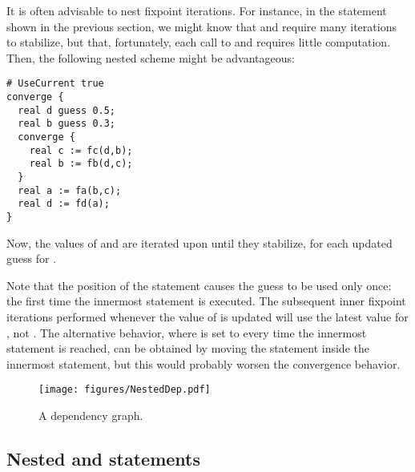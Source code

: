 It is often advisable to nest fixpoint iterations.
For instance, in the  statement shown in the previous
section, we might know that  and 
require many iterations to stabilize, but that, fortunately, each call
to  and  requires little computation.  Then, the
following nested scheme might be advantageous:
\begin{lstlisting}
# UseCurrent true
converge {
  real d guess 0.5;
  real b guess 0.3;
  converge {
    real c := fc(d,b);
    real b := fb(d,c);
  }
  real a := fa(b,c);
  real d := fd(a);
}
\end{lstlisting}
Now, the values of  and  are iterated upon
until they stabilize, for each updated guess for .

Note that the position of the statement  causes
the guess  to be used only once: the first time the innermost
 statement is executed.  The subsequent inner fixpoint
iterations performed whenever the value of  is updated will use the
latest value for , not .  The alternative behavior, where
 is set to  every time the innermost 
statement is reached, can be obtained by moving the statement
 inside the innermost  statement,
but this would probably worsen the convergence behavior.

\begin{figure}
  \centering
  \texttt{[image: figures/NestedDep.pdf]}
  \caption{A  dependency graph.}
  \label{FIG:NestedDep}
\end{figure}

\subsection{Nested  and  statements}

